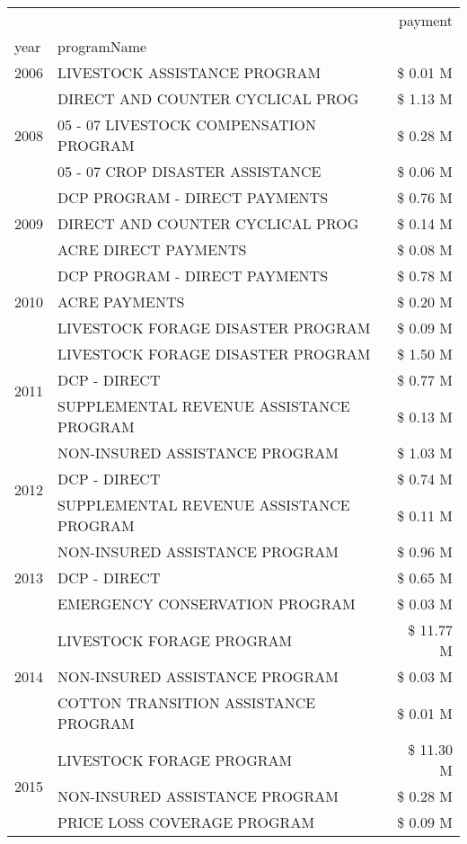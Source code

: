 \begin{tabular}{llr}
\toprule
 &  & payment \\
year & programName &  \\
\midrule
2006 & LIVESTOCK ASSISTANCE PROGRAM & \$ 0.01 M \\
\cline{1-3}
\multirow[t]{3}{*}{2008} & DIRECT AND COUNTER CYCLICAL PROG & \$ 1.13 M \\
 & 05 - 07 LIVESTOCK COMPENSATION PROGRAM & \$ 0.28 M \\
 & 05 - 07 CROP DISASTER ASSISTANCE & \$ 0.06 M \\
\cline{1-3}
\multirow[t]{3}{*}{2009} & DCP PROGRAM - DIRECT PAYMENTS & \$ 0.76 M \\
 & DIRECT AND COUNTER CYCLICAL PROG & \$ 0.14 M \\
 & ACRE DIRECT PAYMENTS & \$ 0.08 M \\
\cline{1-3}
\multirow[t]{3}{*}{2010} & DCP PROGRAM - DIRECT PAYMENTS & \$ 0.78 M \\
 & ACRE PAYMENTS & \$ 0.20 M \\
 & LIVESTOCK FORAGE DISASTER  PROGRAM & \$ 0.09 M \\
\cline{1-3}
\multirow[t]{3}{*}{2011} & LIVESTOCK FORAGE DISASTER PROGRAM & \$ 1.50 M \\
 & DCP - DIRECT & \$ 0.77 M \\
 & SUPPLEMENTAL REVENUE ASSISTANCE PROGRAM & \$ 0.13 M \\
\cline{1-3}
\multirow[t]{3}{*}{2012} & NON-INSURED ASSISTANCE PROGRAM & \$ 1.03 M \\
 & DCP - DIRECT & \$ 0.74 M \\
 & SUPPLEMENTAL REVENUE ASSISTANCE PROGRAM & \$ 0.11 M \\
\cline{1-3}
\multirow[t]{3}{*}{2013} & NON-INSURED ASSISTANCE PROGRAM & \$ 0.96 M \\
 & DCP - DIRECT & \$ 0.65 M \\
 & EMERGENCY CONSERVATION PROGRAM & \$ 0.03 M \\
\cline{1-3}
\multirow[t]{3}{*}{2014} & LIVESTOCK FORAGE PROGRAM & \$ 11.77 M \\
 & NON-INSURED ASSISTANCE PROGRAM & \$ 0.03 M \\
 & COTTON TRANSITION ASSISTANCE PROGRAM & \$ 0.01 M \\
\cline{1-3}
\multirow[t]{3}{*}{2015} & LIVESTOCK FORAGE PROGRAM & \$ 11.30 M \\
 & NON-INSURED ASSISTANCE PROGRAM & \$ 0.28 M \\
 & PRICE LOSS COVERAGE PROGRAM & \$ 0.09 M \\

\end{tabular}

